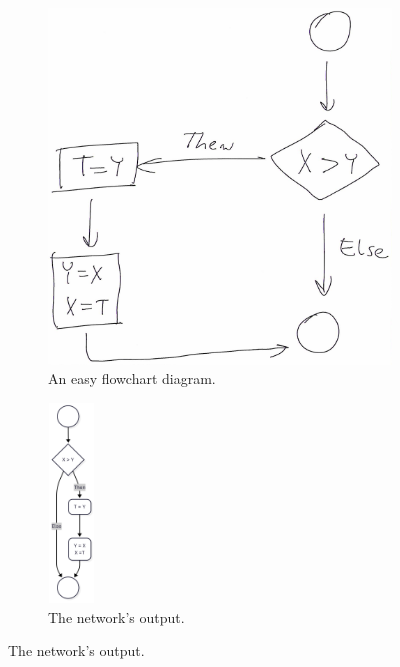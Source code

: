 \documentclass[conference]{IEEEtran}
\begin{document}
\begin{figure}[htbp]
	\centering
	
	\begin{subfigure}[b]{0.45\linewidth}
		\includegraphics[width=\linewidth]{ex1.png}
		\caption{An easy flowchart diagram.}
	\end{subfigure}
	\hfill
	\begin{subfigure}[b]{0.45\linewidth}
		\includegraphics[width=35pt, height=150pt]{ex2.png}
		\caption{The network's output.}
	\end{subfigure}
	
	\vspace{1em} %
	

\end{figure}
\end{document}
